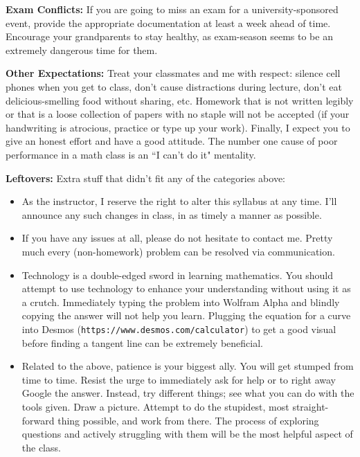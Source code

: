 \documentclass[12pt]{amsbook}
\begin{document}
\textbf{Exam Conflicts:} If you are going to miss an exam for a university-sponsored event, provide the appropriate documentation at least a week ahead of time. Encourage your grandparents to stay healthy, as exam-season seems to be an extremely dangerous time for them.

\textbf{Other Expectations:} Treat your classmates and me with respect: silence cell phones when you get to class, don't cause distractions during lecture, don't eat delicious-smelling food without sharing, etc. Homework that is not written legibly or that is a loose collection of papers with no staple will not be accepted (if your handwriting is atrocious, practice or type up your work). Finally, I expect you to give an honest effort and have a good attitude. The number one cause of poor performance in a math class is an ``I can't do it" mentality.

\textbf{Leftovers:} Extra stuff that didn't fit any of the categories above:
\begin{itemize}
\item As the instructor, I reserve the right to alter this syllabus at any time. I'll announce any such changes in class, in as timely a manner as possible. 
\item If you have any issues at all, please do not hesitate to contact me. Pretty much every (non-homework) problem can be resolved via communication.
\item Technology is a double-edged sword in learning mathematics. You should attempt to use technology to enhance your understanding without using it as a crutch. Immediately typing the problem into Wolfram Alpha and blindly copying the answer will not help you learn. Plugging the equation for a curve into Desmos (\texttt{https://www.desmos.com/calculator}) to get a good visual before finding a tangent line can be extremely beneficial.
\item Related to the above, patience is your biggest ally. You will get stumped from time to time. Resist the urge to immediately ask for help or to right away Google the answer. Instead, try different things; see what you can do with the tools given. Draw a picture. Attempt to do the stupidest, most straight-forward thing possible, and work from there. The process of exploring questions and actively struggling with them will be the most helpful aspect of the class.
\end{itemize}
\end{document}
